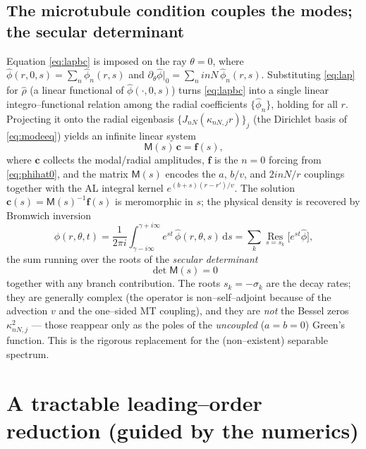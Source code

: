 \documentclass{article}
\newcommand{\rd}{\mathrm{d}}
\begin{document}
\subsection{The microtubule condition couples the modes; the secular
determinant}
Equation \eqref{eq:lapbc} is imposed on the ray $\theta=0$, where
$\widehat\phi(r,0,s)=\sum_n\widehat\phi_n(r,s)$ and
$\partial_\theta\widehat\phi|_0=\sum_n inN\,\widehat\phi_n(r,s)$. Substituting
\eqref{eq:lap} for $\widehat\rho$ (a linear functional of
$\widehat\phi(\cdot,0,s)$) turns \eqref{eq:lapbc} into a single linear
integro--functional relation among the radial coefficients
$\{\widehat\phi_n\}$, holding for all $r$. Projecting it onto the radial
eigenbasis $\{J_{nN}(\kappa_{nN,j}r)\}_j$ (the Dirichlet basis of
\eqref{eq:modeeq}) yields an infinite linear system
\begin{equation}
\mathsf{M}(s)\,\mathbf c=\mathbf f(s),
\label{eq:linsys}
\end{equation}
where $\mathbf c$ collects the modal/radial amplitudes, $\mathbf f$ is the
$n=0$ forcing from \eqref{eq:phihat0}, and the matrix $\mathsf M(s)$ encodes the
$a$, $b/v$, and $2inN/r$ couplings together with the AL integral kernel
$e^{(b+s)(r-r')/v}$. The solution $\mathbf c(s)=\mathsf M(s)^{-1}\mathbf f(s)$
is meromorphic in $s$; the physical density is recovered by Bromwich inversion
\begin{equation}
\phi(r,\theta,t)=\frac{1}{2\pi i}\int_{\gamma-i\infty}^{\gamma+i\infty}
e^{st}\,\widehat\phi(r,\theta,s)\,\rd s
=\sum_{k}\operatorname*{Res}_{s=s_k}\bigl[e^{st}\widehat\phi\bigr],
\end{equation}
the sum running over the roots of the \emph{secular determinant}
\begin{equation}
\boxed{\ \det \mathsf M(s)=0\ }
\label{eq:secular}
\end{equation}
together with any branch contribution. The roots $s_k=-\sigma_k$ are the decay
rates; they are generally complex (the operator is non--self--adjoint because of
the advection $v$ and the one--sided MT coupling), and they are \emph{not} the
Bessel zeros $\kappa_{nN,j}^2$ --- those reappear only as the poles of the
\emph{uncoupled} ($a=b=0$) Green's function. This is the rigorous replacement
for the (non--existent) separable spectrum.

\section{A tractable leading--order reduction (guided by the numerics)}
\end{document}
